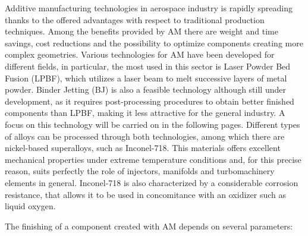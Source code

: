 Additive manufacturing technologies in aerospace industry is rapidly spreading thanks to the offered advantages with respect to traditional production techniques. Among the benefits provided by AM there are weight and time savings, cost reductions and  the possibility to optimize components creating more complex geometries\cite{materials_and_desing}.
Various technologies for AM have been developed for different fields, in particular, the most used in this sector is Laser Powder Bed Fusion (LPBF), which utilizes a laser beam to melt successive layers of metal powder. Binder Jetting (BJ) is also a feasible technology although still under development, as it requires post-processing procedures to obtain better finished components than LPBF, making it less attractive for the general industry. A focus on this technology will be carried on in the following pages. Different types of alloys can be processed through both technologies, among which there are nickel-based superalloys, such as Inconel-718. This materials offers excellent mechanical properties under extreme temperature conditions and, for this precise reason, suits perfectly the role of injectors, manifolds and turbomachinery elements in general. Inconel-718 is also characterized by a considerable corrosion resistance, that allows it to be used in concomitance with an oxidizer such as liquid oxygen\cite{Inconel_vs_steel}. 

The finishing of a component created with AM depends on several parameters: 

